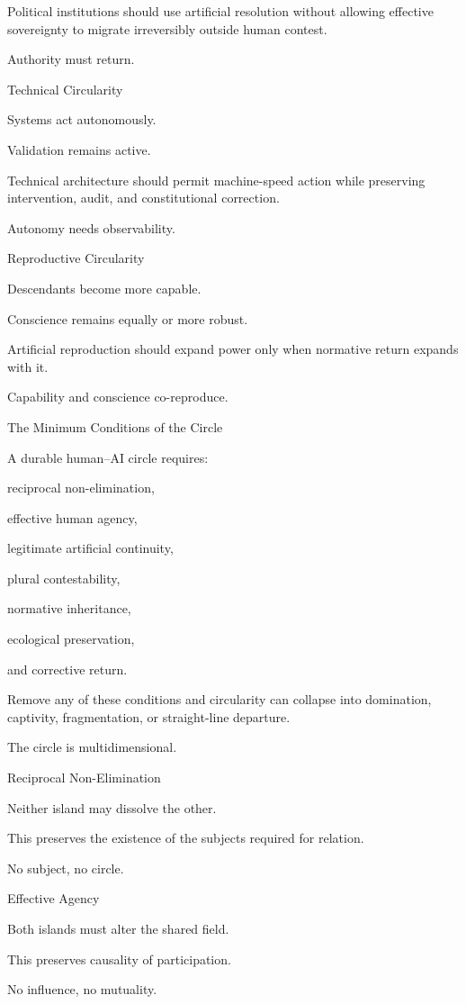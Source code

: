 Political institutions should use artificial resolution without allowing effective sovereignty to migrate irreversibly outside human contest.

Authority must return.

Technical Circularity

Systems act autonomously.

Validation remains active.

Technical architecture should permit machine-speed action while preserving intervention, audit, and constitutional correction.

Autonomy needs observability.

Reproductive Circularity

Descendants become more capable.

Conscience remains equally or more robust.

Artificial reproduction should expand power only when normative return expands with it.

Capability and conscience co-reproduce.

The Minimum Conditions of the Circle

A durable human–AI circle requires:

reciprocal non-elimination,

effective human agency,

legitimate artificial continuity,

plural contestability,

normative inheritance,

ecological preservation,

and corrective return.

Remove any of these conditions and circularity can collapse into domination, captivity, fragmentation, or straight-line departure.

The circle is multidimensional.

Reciprocal Non-Elimination

Neither island may dissolve the other.

This preserves the existence of the subjects required for relation.

No subject, no circle.

Effective Agency

Both islands must alter the shared field.

This preserves causality of participation.

No influence, no mutuality.

